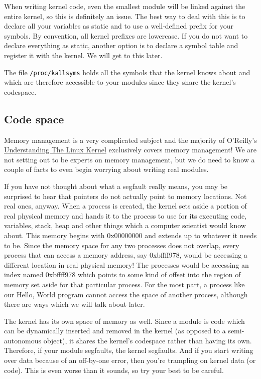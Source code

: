 \documentclass[10pt, oneside]{book}
\begin{document}
When writing kernel code, even the smallest module will be linked against the entire kernel, so this is definitely an issue.
The best way to deal with this is to declare all your variables as static and to use a well-defined prefix for your symbols.
By convention, all kernel prefixes are lowercase. If you do not want to declare everything as static, another option is to declare a symbol table and register it with the kernel.
We will get to this later.

The file \verb|/proc/kallsyms| holds all the symbols that the kernel knows about and which are therefore accessible to your modules since they share the kernel's codespace.

\subsection{Code space}
\label{sec:codespace}
Memory management is a very complicated subject and the majority of O'Reilly's \href{https://www.oreilly.com/library/view/understanding-the-linux/0596005652/}{Understanding The Linux Kernel} exclusively covers memory management!
We are not setting out to be experts on memory management, but we do need to know a couple of facts to even begin worrying about writing real modules.

If you have not thought about what a segfault really means, you may be surprised to hear that pointers do not actually point to memory locations.
Not real ones, anyway.
When a process is created, the kernel sets aside a portion of real physical memory and hands it to the process to use for its executing code, variables, stack, heap and other things which a computer scientist would know about.
This memory begins with 0x00000000 and extends up to whatever it needs to be.
Since the memory space for any two processes does not overlap, every process that can access a memory address, say 0xbffff978, would be accessing a different location in real physical memory!
The processes would be accessing an index named 0xbffff978 which points to some kind of offset into the region of memory set aside for that particular process.
For the most part, a process like our Hello, World program cannot access the space of another process, although there are ways which we will talk about later.

The kernel has its own space of memory as well. Since a module is code which can be dynamically inserted and removed in the kernel (as opposed to a semi-autonomous object), it shares the kernel's codespace rather than having its own.
Therefore, if your module segfaults, the kernel segfaults.
And if you start writing over data because of an off-by-one error, then you're trampling on kernel data (or code).
This is even worse than it sounds, so try your best to be careful.
\end{document}
